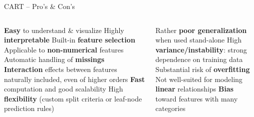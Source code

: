 
\begin{frame}{CART -- Pro's \& Con's}

\begin{columns}[onlytextwidth]
  \begin{column}{0.5\textwidth}
    \footnotesize
    \begin{itemize}
      \positem \textbf{Easy} to understand \& visualize
      \positem Highly \textbf{interpretable}
      \positem Built-in \textbf{feature selection}
      \positem Applicable to \textbf{non-numerical} features
      \positem Automatic handling of \textbf{missings} 
      \positem \textbf{Interaction} effects between features naturally included, 
      even of higher orders
      \positem \textbf{Fast} computation and good scalability
      \positem High \textbf{flexibility} (custom split criteria or leaf-node 
      prediction rules)   
    \end{itemize}
  \end{column}
  \begin{column}{0.5\textwidth}
    \footnotesize
    \begin{itemize}
      \negitem Rather \textbf{poor generalization} when used stand-alone 
      \negitem High \textbf{variance/instability}: strong dependence on training 
      data
      \negitem Substantial risk of \textbf{overfitting}
      \negitem Not well-suited for modeling \textbf{linear} relationships
      \negitem \textbf{Bias} toward features with many categories
    \end{itemize}
  \end{column}
\end{columns}

\vfill

\small


\end{frame}


